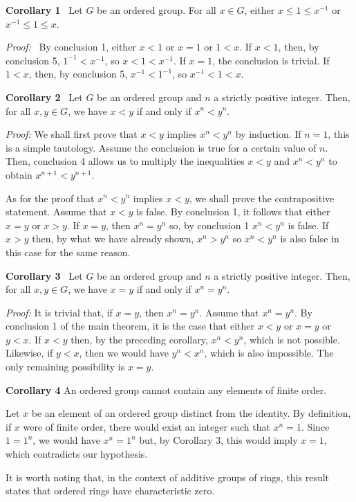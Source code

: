 \documentclass[12pt]{article}
\begin{document}
\textbf{Corollary 1} \, Let $G$ be an ordered group.  For all $x \in G$, either $x \le 1 \le x^{-1}$ or $x^{-1} \le 1 \le x$.

{\it Proof:}  \, By conclusion 1, either $x < 1$ or $x = 1$ or $1 < x$.  If $x < 1$, then, by conclusion 5, $1^{-1} < x^{-1}$, so $x < 1 < x^{-1}$.  If $x = 1$, the conclusion is trivial.  If $1 < x$, then, by conclusion 5, $x^{-1} < 1^{-1}$, so $x^{-1} < 1 < x$.

\textbf{Corollary 2} \, Let $G$ be an ordered group and $n$ a strictly positive integer.  Then, for all $x, y \in G$, we have $x < y$ if and only if $x^n < y^n$.

{\it Proof:}  We shall first prove that $x < y$ implies $x^n < y^n$ by induction.  If $n = 1$, this is a simple tautology.  Assume the conclusion is true for a certain value of $n$.  Then, conclusion 4 allows us to multiply the inequalities $x < y$ and $x^n < y^n$ to obtain $x^{n+1} < y^{n+1}$.

As for the proof that $x^n < y^n$ implies $x < y$, we shall prove the contrapositive statement.  Assume that $x < y$ is false.  By conclusion 1, it follows that either $x = y$ or $x > y$.  If $x = y$, then $x^n = y^n$ so, by conclusion 1 $x^n < y^n$ is false.  If $x > y$ then, by what we have already shown, $x^n > y^n$ so $x^n < y^n$ is also false in this case for the same reason. 

\textbf{Corollary 3} \, Let $G$ be an ordered group and $n$ a strictly positive integer.  Then, for all $x, y \in G$, we have $x = y$ if and only if $x^n = y^n$.

{\it Proof:}  It is trivial that, if $x = y$, then $x^n = y^n$.  Assume that $x^n = y^n$.  By conclusion 1 of the main theorem, it is the case that either $x < y$ or $x = y$ or $y < x$.  If $x < y$ then, by the preceding corollary, $x^n < y^n$, which is not possible.  Likewise, if $y < x$, then we would have $y^n < x^n$, which is also impossible.  The only remaining possibility is $x = y$.

\textbf{Corollary 4}  An ordered group cannot contain any elements of
finite order.

Let $x$ be an element of an ordered group distinct from the identity.
By definition, if $x$ were of finite order, there would exist an
integer such that $x^n = 1$.  Since $1 = 1^n$, we would have $x^n =
1^n$ but, by Corollary 3, this would imply $x=1$, which contradicts
our hypothesis.

It is worth noting that, in the context of additive groups of rings,
this result states that ordered rings have characteristic zero.
\end{document}
